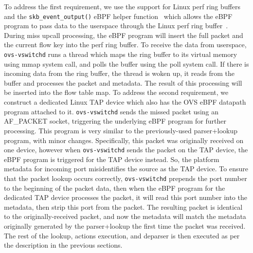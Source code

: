 \documentclass[10pt]{sigplanconf}
\begin{document}
To address the first requirement, we use the support for Linux perf ring
buffers and the \verb+skb_event_output()+ eBPF helper function~\cite{ebpfperf}
which allows the eBPF program to pass data to the userspace through the Linux perf
ring buffer~\cite{ebpfperf}.  During miss upcall processing, the eBPF program
will insert the full packet and the current flow key into the perf ring buffer.
To receive the data from userspace, \verb+ovs-vswitchd+ runs a thread which
maps the ring buffer to its virtual memory using mmap system call, and polls
the buffer using the poll system call. If there is incoming data from the ring buffer, the
thread is woken up, it reads from the buffer and processes the packet and
metadata. The result of this processing will be inserted into the flow table
map.
To address the second requirement, we construct a dedicated Linux TAP device
which also has the OVS eBPF datapath program attached to it.
\verb+ovs-vswitchd+ sends the missed packet using an AF\_PACKET socket,
triggering the underlying eBPF program for further processing.
This program is very similar to the
previously-used parser+lookup program, with minor changes. Specifically, this
packet was originally received on one device, however when \verb+ovs-vswitchd+
sends the packet on the TAP device, the eBPF program is triggered for the TAP
device instead. So, the platform metadata for incoming port misidentifies the
source as the TAP device. To ensure that the packet lookup occurs correctly,
\verb+ovs-vswitchd+ prepends the port number to the beginning of the packet
data, then when the eBPF program for the dedicated TAP device processes the
packet, it will read this port number into the metadata, then strip this port
from the packet. The resulting packet is identical to the originally-received
packet, and now the metadata will match the metadata originally generated by
the parser+lookup the first time the packet was received. The rest of the
lookup, actions execution, and deparser is then executed as per the description
in the previous sections.
\end{document}
